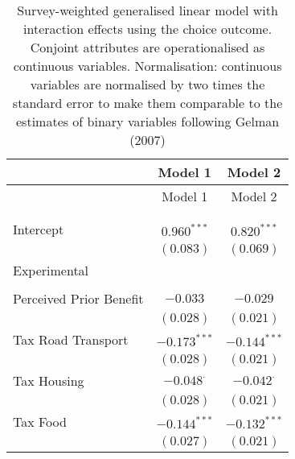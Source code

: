 
\begin{center}
\begin{tiny}
\begin{longtable}{l@{} c@{} c@{}}
\hline
 & Model 1 & Model 2 \\
\hline
\endfirsthead
\hline
 & Model 1 & Model 2 \\
\hline
\endhead
\hline
\endfoot
\hline
\multicolumn{3}{l}{\tiny{$^{***}p<0.001$; $^{**}p<0.01$; $^{*}p<0.05$; $^{\cdot}p<0.1$}}\\
\caption{Survey-weighted generalised linear model with interaction effects using the choice outcome. Conjoint attributes are operationalised as continuous variables. Normalisation: continuous variables are normalised by two times 
               the standard error to make them comparable to the estimates of binary variables following Gelman (2007)}
\label{table:weighted_interactions_exp_continous_choice}
\endlastfoot \\
Intercept                                                & $0.960^{***}$    & $0.820^{***}$    \\
                                                         & $(0.083)$        & $(0.069)$        \\
Experimental                                             &                  &                  \\
                                                         &                  &                  \\
\quad Perceived Prior Benefit                            & $-0.033$         & $-0.029$         \\
                                                         & $(0.028)$        & $(0.021)$        \\
\quad Tax Road Transport                                 & $-0.173^{***}$   & $-0.144^{***}$   \\
                                                         & $(0.028)$        & $(0.021)$        \\
\quad Tax Housing                                        & $-0.048^{\cdot}$ & $-0.042^{\cdot}$ \\
                                                         & $(0.028)$        & $(0.021)$        \\
\quad Tax Food                                           & $-0.144^{***}$   & $-0.132^{***}$   \\
                                                         & $(0.027)$        & $(0.021)$        \\

\end{longtable}
\end{tiny}
\end{center}
